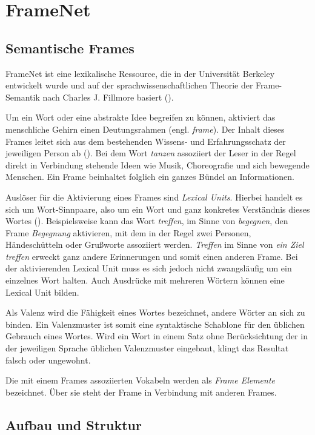 \section{FrameNet}

\subsection{Semantische Frames}

FrameNet ist eine lexikalische Ressource, die in der Universität Berkeley entwickelt wurde und  auf der sprachwissenschaftlichen Theorie der Frame-Semantik nach Charles J. Fillmore basiert (\cite[vgl.][1]{NLTKPROJEKT}).
\par
Um ein Wort oder eine abstrakte Idee begreifen zu können, aktiviert das menschliche Gehirn einen Deutungsrahmen (engl. \textit{frame}). Der Inhalt dieses Frames leitet sich aus dem bestehenden Wissens- und Erfahrungsschatz der jeweiligen Person ab (\cite[vgl.][28]{WEHLING}). Bei dem Wort \textit{tanzen} assoziiert der Leser in der Regel direkt in Verbindung stehende Ideen wie Musik, Choreografie und sich bewegende Menschen. Ein Frame beinhaltet folglich ein ganzes Bündel an Informationen.
\par
Auslöser für die Aktivierung eines Frames sind \textit{Lexical Units}. Hierbei handelt es sich um Wort-Sinnpaare, also um ein Wort und ganz konkretes Verständnis dieses Wortes (\cite[vgl.][1]{NLTKPROJEKT}). Beispielsweise kann das Wort \textit{treffen}, im Sinne von \textit{begegnen}, den Frame \textit{Begegnung} aktivieren, mit dem in der Regel zwei Personen, Händeschütteln oder Grußworte assoziiert werden. \textit{Treffen} im Sinne von \textit{ein Ziel treffen} erweckt ganz andere Erinnerungen und somit einen anderen Frame. Bei der aktivierenden Lexical Unit muss es sich jedoch nicht zwangsläufig um ein einzelnes Wort halten. Auch Ausdrücke mit mehreren Wörtern können eine Lexical Unit bilden.
\par
Als Valenz wird die Fähigkeit eines Wortes bezeichnet, andere Wörter an sich zu binden. Ein Valenzmuster ist somit eine syntaktische Schablone für den üblichen Gebrauch eines Wortes. Wird ein Wort in einem Satz ohne Berücksichtung der in der jeweiligen Sprache üblichen Valenzmuster eingebaut, klingt das Resultat falsch oder ungewohnt.
\par
Die mit einem Frames assoziierten Vokabeln werden als \textit{Frame Elemente} bezeichnet. Über sie steht der Frame in Verbindung mit anderen Frames. 

\subsection{Aufbau und Struktur}

